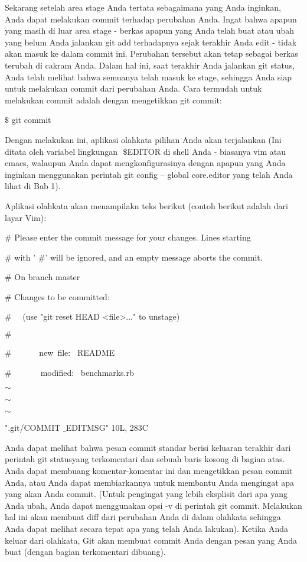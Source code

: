  \par
\noindent 
Sekarang setelah area stage Anda tertata sebagaimana yang Anda inginkan, Anda dapat melakukan commit terhadap perubahan Anda. Ingat bahwa apapun yang masih di luar area stage - berkas apapun yang Anda telah buat atau ubah yang belum Anda jalankan $  $git add $  $terhadapnya sejak terakhir Anda edit - tidak akan masuk ke dalam commit ini. Perubahan tersebut akan tetap sebagai berkas terubah di cakram Anda. Dalam hal ini, saat terakhir Anda jalankan $  $git status, Anda telah melihat bahwa semuanya telah masuk ke stage, sehingga Anda siap untuk melakukan commit dari perubahan Anda. Cara termudah untuk melakukan commit adalah dengan mengetikkan $  $git commit: \par
\noindent 
 $  \$  $ git commit \par
\noindent 
Dengan melakukan ini, aplikasi olahkata pilihan Anda akan terjalankan (Ini ditata oleh variabel lingkungan $  $ $  \$  $EDITOR $  $di shell Anda - biasanya vim atau emacs, walaupun Anda dapat mengkonfigurasinya dengan apapun yang Anda inginkan menggunakan perintah $  $git config -- global core.editor $  $yang telah Anda lihat di Bab 1). \par
\noindent 
Aplikasi olahkata akan menampilakn teks berikut (contoh berikut adalah dari layar Vim): \par
\noindent 
 $  \#  $ Please enter the commit message for your changes. Lines starting \par
\noindent 
 $  \#  $ with ' $  \#  $' will be ignored, and an empty message aborts the commit. \par
\noindent 
 $  \#  $ On branch master \par
\noindent 
 $  \#  $ Changes to be committed: \par
\noindent 
 $  \#  $~~ (use "git reset HEAD <file>..." to unstage) \par
\noindent 
 $  \#  $ \par
\noindent 
 $  \#  $~~~~~~ new~file:~  README \par
\noindent 
 $  \#  $~~~~~~~modified:~  benchmarks.rb \par
\noindent 
 $  \sim  $ \par
\noindent 
 $  \sim  $ \par
\noindent 
 $  \sim  $ \par
\noindent 
".git/COMMIT $  \_  $EDITMSG" 10L, 283C \par
\noindent 
Anda dapat melihat bahwa pesan commit standar berisi keluaran terakhir dari perintah $  $git statusyang terkomentari dan sebuah baris kosong di bagian atas. Anda dapat membuang komentar-komentar ini dan mengetikkan pesan commit Anda, atau Anda dapat membiarkannya untuk membantu Anda mengingat apa yang akan Anda commit. (Untuk pengingat yang lebih eksplisit dari apa yang Anda ubah, Anda dapat menggunakan opsi $  $-v $  $di perintah $  $git commit. Melakukan hal ini akan membuat diff dari perubahan Anda di dalam olahkata sehingga Anda dapat melihat secara tepat apa yang telah Anda lakukan). Ketika Anda keluar dari olahkata, Git akan membuat commit Anda dengan pesan yang Anda buat (dengan bagian terkomentari dibuang). \par
